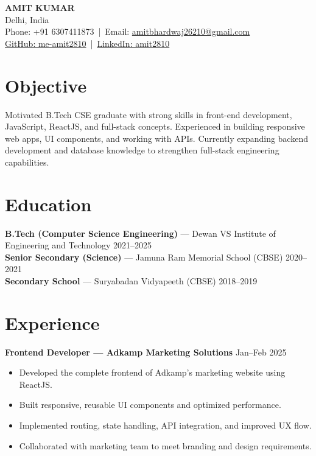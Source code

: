 \documentclass[11pt,a4paper]{article}
\begin{document}
\begin{center}
    {\LARGE \textbf{AMIT KUMAR}}\\[2pt]
    Delhi, India \\
    Phone: +91 6307411873 \,|\, 
    Email: \href{mailto:Amitbhardwaj26210@gmail.com}{amitbhardwaj26210@gmail.com} \\
    \href{https://github.com/me-amit2810}{GitHub: me-amit2810} \,|\, 
    \href{https://www.linkedin.com/in/amit2810}{LinkedIn: amit2810}
\end{center}

\section*{Objective}
Motivated B.Tech CSE graduate with strong skills in front-end development, JavaScript, ReactJS, and full-stack concepts. Experienced in building responsive web apps, UI components, and working with APIs. Currently expanding backend development and database knowledge to strengthen full-stack engineering capabilities.

\section*{Education}
\textbf{B.Tech (Computer Science Engineering)} — Dewan VS Institute of Engineering and Technology \hfill 2021–2025 \\
\textbf{Senior Secondary (Science)} — Jamuna Ram Memorial School (CBSE) \hfill 2020–2021 \\
\textbf{Secondary School} — Suryabadan Vidyapeeth (CBSE) \hfill 2018–2019

\section*{Experience}

\textbf{Frontend Developer — Adkamp Marketing Solutions} \hfill Jan–Feb 2025 \\
\begin{itemize}
    \item Developed the complete frontend of Adkamp’s marketing website using ReactJS.
    \item Built responsive, reusable UI components and optimized performance.
    \item Implemented routing, state handling, API integration, and improved UX flow.
    \item Collaborated with marketing team to meet branding and design requirements.
\end{itemize}
\end{document}
